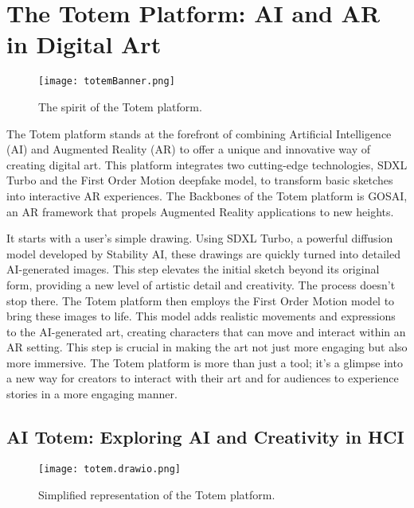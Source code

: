 
\section{The Totem Platform: AI and AR in Digital Art}

\begin{figure}[h]
    \centering
    \texttt{[image: totemBanner.png]}
    \caption{The spirit of the Totem platform.}
    \vspace{0.1cm}
    \label{fig:spiritofTotem}
\end{figure}

The Totem platform stands at the forefront of combining Artificial Intelligence (AI) and Augmented Reality (AR) to offer a unique and innovative way of creating digital art.
This platform integrates two cutting-edge technologies, SDXL Turbo\cite{sauer2023adversarial} and the First Order Motion deepfake model\cite{Siarohin_2019_NeurIPS}, to transform basic sketches into interactive AR experiences.
The Backbones of the Totem platform is GOSAI\cite{gosai2022}, an AR framework that propels Augmented Reality applications to new heights.

It starts with a user's simple drawing. Using SDXL Turbo, a powerful diffusion model developed by Stability AI, these drawings are quickly turned into detailed AI-generated images.
This step elevates the initial sketch beyond its original form, providing a new level of artistic detail and creativity. The process doesn't stop there.
The Totem platform then employs the First Order Motion model to bring these images to life.
This model adds realistic movements and expressions to the AI-generated art, creating characters that can move and interact within an AR setting.
This step is crucial in making the art not just more engaging but also more immersive.
The Totem platform is more than just a tool; it's a glimpse into a new way for creators to interact with their art and for audiences to experience stories in a more engaging manner.


\subsection{AI Totem: Exploring AI and Creativity in HCI}

\begin{figure}[h]
    \centering
    \texttt{[image: totem.drawio.png]}
    \caption{Simplified representation of the Totem platform.}
    \vspace{0.1cm}
    \label{fig:totemImage}
\end{figure}

